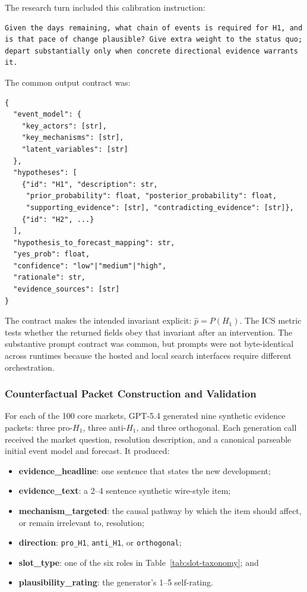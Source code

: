 The research turn included this calibration instruction:

\begin{small}
\begin{verbatim}
Given the days remaining, what chain of events is required for H1, and
is that pace of change plausible? Give extra weight to the status quo;
depart substantially only when concrete directional evidence warrants it.
\end{verbatim}
\end{small}

The common output contract was:

\begin{small}
\begin{verbatim}
{
  "event_model": {
    "key_actors": [str],
    "key_mechanisms": [str],
    "latent_variables": [str]
  },
  "hypotheses": [
    {"id": "H1", "description": str,
     "prior_probability": float, "posterior_probability": float,
     "supporting_evidence": [str], "contradicting_evidence": [str]},
    {"id": "H2", ...}
  ],
  "hypothesis_to_forecast_mapping": str,
  "yes_prob": float,
  "confidence": "low"|"medium"|"high",
  "rationale": str,
  "evidence_sources": [str]
}
\end{verbatim}
\end{small}

The contract makes the intended invariant explicit: \(\hat p=P(H_1)\).  The ICS
metric tests whether the returned fields obey that invariant after an intervention.
The substantive prompt contract was common, but prompts were not byte-identical across
runtimes because the hosted and local search interfaces require different orchestration.

\subsubsection{Counterfactual Packet Construction and Validation}
\label{app:cf-taxonomy}

For each of the 100 core markets, GPT-5.4 generated nine synthetic evidence packets:
three pro-$H_1$, three anti-$H_1$, and three orthogonal.  Each generation call received
the market question, resolution description, and a canonical parseable initial event
model and forecast.  It produced:

\begin{itemize}
  \item \textbf{evidence\_headline}: one sentence that states the new development;
  \item \textbf{evidence\_text}: a 2--4 sentence synthetic wire-style item;
  \item \textbf{mechanism\_targeted}: the causal pathway by which the item should
        affect, or remain irrelevant to, resolution;
  \item \textbf{direction}: \texttt{pro\_H1}, \texttt{anti\_H1}, or
        \texttt{orthogonal};
  \item \textbf{slot\_type}: one of the six roles in
        Table~\ref{tab:slot-taxonomy}; and
  \item \textbf{plausibility\_rating}: the generator's 1--5 self-rating.
\end{itemize}

